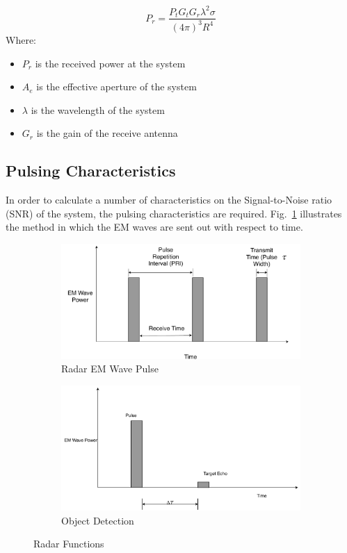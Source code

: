 \documentclass[11pt]{witseiepaper}
\begin{document}
\begin{bibunit}[witseie]
\begin{equation} \label{eqn:ReceivedPower}
    P_{r} = \frac{P_{t} G_{t} G_{r} \lambda^2 \sigma}{(4 \pi )^3 R^4}
\end{equation}
Where:
\begin{itemize}
    \item $P_{r}$ is the received power at the system
    \item $A_{e}$ is the effective aperture of the system
    \item $\lambda$ is the wavelength of the system
    \item $G_{r}$ is the gain of the receive antenna
\end{itemize}

\subsection{Pulsing Characteristics} \label{sec:PulsingCharacteristics}
In order to calculate a number of characteristics on the Signal-to-Noise ratio (SNR) of the system, the pulsing characteristics are required. Fig.~\ref{fig:Pulsing} illustrates the method in which the EM waves are sent out with respect to time. 

\begin{figure}[htb]
    \centering
    \begin{subfigure}{.5\textwidth}
        \centering
            \includegraphics[width=0.7\linewidth]{Pulsing.pdf}
            \caption{Radar EM Wave Pulse}
            \label{fig:Pulsing}
        \end{subfigure}%
        \begin{subfigure}{.5\textwidth}
            \centering
            \includegraphics[width=0.7\linewidth]{ObjectDetection.pdf}
            \caption{Object Detection}
                \label{fig:ObjectDetection}
            \end{subfigure}
\caption{Radar Functions}
\label{fig:RadarFunctions}
\end{figure}


\end{bibunit}
\end{document}
